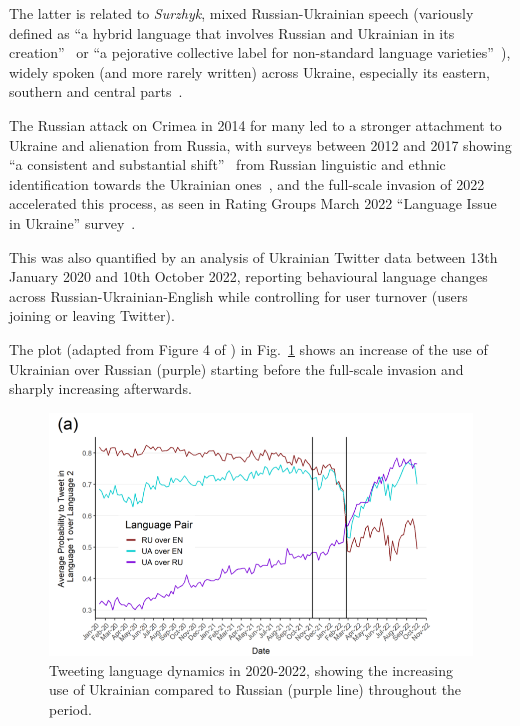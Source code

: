 The latter is related to \emph{Surzhyk}, mixed Russian-Ukrainian speech
(variously defined as ``a hybrid language that involves Russian and
Ukrainian in its creation''~\cite{Sira2019} or ``a pejorative collective
label for non-standard language
varieties''~\cite{bernsand2001surzhyk}), widely spoken (and
more rarely written) across Ukraine, especially its eastern, southern
and central parts~\cite{Sira2019}.

The Russian attack on Crimea in 2014 for many led to a stronger attachment
to Ukraine and alienation from Russia, with surveys between 2012 and
2017 showing ``a consistent and substantial shift''~\cite{Racek2024} from
Russian linguistic and ethnic identification towards the
Ukrainian ones~\cite{kulyk2018shedding}, and the full-scale invasion of 2022
accelerated this process, as seen in Rating Group\textquotesingle s
March 2022 ``Language Issue in Ukraine''
survey~\cite{ratinggroupSixthNational}.

This was also quantified by an analysis \cite{Racek2024} of Ukrainian
Twitter data between 13th January 2020 and 10th October 2022, reporting
behavioural language changes across Russian-Ukrainian-English while
controlling for user turnover (users joining or leaving Twitter).

The plot (adapted from Figure 4 of \cite{Racek2024}) in Fig.~\ref{fig:twitter} shows an increase of the use of Ukrainian over Russian
(purple) starting before the full-scale invasion and sharply increasing
afterwards. 

\begin{figure}[t]
\centering
\includegraphics[width=1.0\linewidth]{Figures/ru_ua_twitter.png}
\decoRule
\caption[Ukrainian language dynamics on Twitter]{Tweeting language dynamics in 2020-2022, showing the increasing use of Ukrainian compared to Russian (purple line) throughout the period.}
\label{fig:twitter}
\end{figure}

